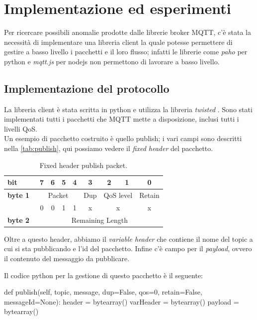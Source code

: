 \documentclass[binding=0.6cm,TFA]{sapthesis}
\begin{document}
\chapter{Implementazione ed esperimenti}
\begin{large}
Per ricercare possibili anomalie prodotte dalle librerie broker MQTT, c'è stata la necessità di implementare una libreria client la quale potesse permettere di gestire a basso livello i pacchetti e il loro flusso; infatti le librerie come \textit{paho} per python e \textit{mqtt.js} per nodejs non permettono di lavorare a basso livello.

\section{Implementazione del protocollo}
La libreria client è stata scritta in python e utilizza la libreria \textit{twisted} \cite{wiki:Twisted}. 
Sono stati implementati tutti i pacchetti che MQTT mette a disposizione, inclusi tutti i livelli QoS. \\
Un esempio di pacchetto costruito è quello publish; i vari campi sono descritti nella \autoref{tab:publish}, qui possiamo vedere il \textit{fixed header} del pacchetto.

\begin{table}[h]
\caption{Fixed header publish packet.}
\label{tab:publishbytes}
\centering
\begin{tabular}{|l|c|c|c|c|c|c|c|c|}
\hline
\textbf{bit}     & 7 & 6 & 5 & 4 & 3   & 2 & 1 & 0       \\
\hline
\textbf{byte 1}  & \multicolumn{4}{|c|}{Packet} & Dup & \multicolumn{2}{|c|}{QoS level} & Retain  \\
\hline
        & 0 & 0 & 1 & 1 & x   & \multicolumn{2}{|c|}{x} & x \\
\hline
\textbf{byte 2}~ & \multicolumn{8}{|c|}{Remaining Length}                                                       \\
\hline
\end{tabular}
\end{table}

Oltre a questo header, abbiamo il \textit{variable header} che contiene il nome del topic a cui si sta pubblicando e l'id del pacchetto. Infine c'è campo per il \textit{payload}, ovvero il contenuto del messaggio da pubblicare.
\newpage

Il codice python per la gestione di questo pacchetto è il seguente:

\begin{python}
def publish(self, topic, message, dup=False, qos=0, retain=False, messageId=None):
    header = bytearray()
    varHeader = bytearray()
    payload = bytearray()
    

\end{python}
\end{large}
\end{document}
